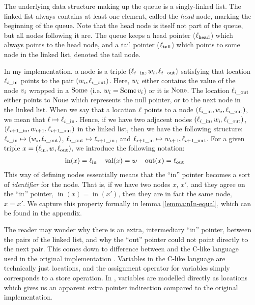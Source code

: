 \documentclass[a4paper, 10pt]{report}
\theoremstyle{definition}
\newcommand{\locin}{\loc_{\mathrm{in}}}
\newcommand{\locinM}[1]{\loc_{#1\_\mathrm{in}}}
\newcommand{\locout}{\loc_{\mathrm{out}}}
\newcommand{\locoutM}[1]{\loc_{#1\_\mathrm{out}}}
\newcommand{\locN}[1]{\loc_{\mathrm{#1}}}
\newcommand{\lochead}{\locN{head}}
\newcommand{\loctail}{\locN{tail}}
\newcommand{\nodeval}{\valB}
\newcommand{\nodevalM}[1]{\nodeval_{#1}}
\newcommand{\nIn}[1]{\operatorname{in}(#1)}
\newcommand{\nVal}[1]{\operatorname{val}(#1)}
\newcommand{\nOut}[1]{\operatorname{out}(#1)}
\newcommand{\node}{x}
\newcommand{\absvalue}{\val}
\begin{document}
The underlying data structure making up the queue is a singly-linked list. The linked-list always contains at least one element, called the \emph{head} node, marking the beginning of the queue. Note that the head node is itself not part of the queue, but all nodes following it are. The queue keeps a head pointer ($\lochead$) which always points to the head node, and a tail pointer ($\loctail$) which points to some node in the linked list, denoted the tail node.

In my implementation, a node is a triple $(\locinM{i}, \nodevalM{i}, \locoutM{i})$ satisfying that location $\locinM{i}$ points to the pair $(\nodevalM{i}, \locoutM{i})$. Here, $\nodevalM{i}$ either contains the value of the node $\absvalue_i$ wrapped in a $\operatorname{Some}$ (i.e. $\nodevalM{i} = \Some \absvalue_i$) or it is $\operatorname{None}$. The location $\locoutM{i}$ either points to $\operatorname{None}$ which represents the null pointer, or to the next node in the linked list. When we say that a location $\ell$ points to a node $(\locinM{i}, \nodevalM{i}, \locoutM{i})$, we mean that $\loc \mapsto \locinM{i}$. Hence, if we have two adjacent nodes $(\locinM{i}, \nodevalM{i}, \locoutM{i})$, $(\locinM{i+1}, \nodevalM{i+1}, \locoutM{i+1})$ in the linked list, then we have the following structure: $\locinM{i} \mapsto (\nodevalM{i}, \locoutM{i})$, $\locoutM{i} \mapsto \locinM{i+1}$, and $\locinM{i+1} \mapsto \nodevalM{i+1}, \locoutM{i+1}$.
For a given triple $\node = (\locin, \nodeval, \locout)$, we introduce the following notation:
\begin{align*}
  &\nIn{\node} = \locin& &\nVal{\node} = \nodeval& &\nOut{\node} = \locout
\end{align*}
This way of defining nodes essentially means that the ``in'' pointer becomes a sort of \textit{identifier} for the node. That is, if we have two nodes $\node$, $\node'$, and they agree on the ``in'' pointer, $\nIn{\node} = \nIn{\node'}$, then they are in fact the same node, $\node = \node'$. We capture this property formally in lemma \ref{lemma:nIn-equal}, which can be found in the appendix.

The reader may wonder why there is an extra, intermediary ``in'' pointer, between the pairs of the linked list, and why the ``out'' pointer could not point directly to the next pair. This comes down to difference between \heaplang and the C-like language used in the original implementation \citep{DBLP:conf/podc/MichaelS96}. Variables in the C-like language are technically just locations, and the assignment operator for variables simply corresponds to a store operation. In \heaplang, variables are modelled directly as locations which gives us an apparent extra pointer indirection compared to the original implementation.
\end{document}
